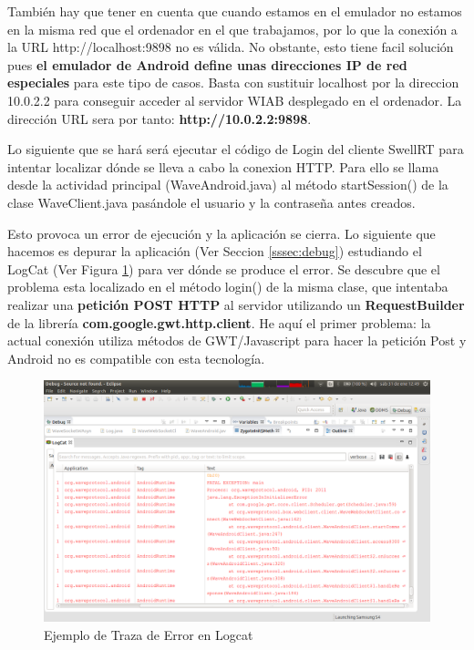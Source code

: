 	  	 También hay que tener en cuenta que cuando estamos en el emulador no estamos en la misma red que el ordenador en el que trabajamos, por lo que la conexión a la URL http://localhost:9898 no es válida. No obstante, esto tiene facil solución pues \textbf{el emulador de Android define unas direcciones IP de red especiales} \cite{ref:android_netAddress} para este tipo de casos. Basta con sustituir localhost por la direccion 10.0.2.2 para conseguir acceder al servidor WIAB desplegado en el ordenador. La dirección URL sera por tanto: \textbf{http://10.0.2.2:9898}. 
	  
	 Lo siguiente que se hará será ejecutar el código de Login del cliente SwellRT para intentar localizar dónde se lleva a cabo la conexion HTTP. Para ello se llama desde la actividad principal (WaveAndroid.java) al método startSession() de la clase WaveClient.java pasándole el usuario y la contraseña antes creados.
 
	 Esto provoca un error de ejecución y la aplicación se cierra. Lo siguiente que hacemos es depurar la aplicación (Ver Seccion \ref{sssec:debug}) estudiando el LogCat \cite{ref:android_logcat} (Ver Figura \ref{fig:android_logcat}) para ver dónde se produce el error. Se descubre que el problema esta localizado en el método login() de la misma clase, que intentaba realizar una \textbf{petición POST HTTP} al servidor utilizando un \textbf{RequestBuilder} de la librería \textbf{com.google.gwt.http.client}. He aquí el primer problema: la actual conexión utiliza métodos de GWT/Javascript para hacer la petición Post y Android no es compatible con esta tecnología.   
	 
	\begin{figure}[H]
      \centering
	\includegraphics[keepaspectratio, scale=0.3]{Media/Captures/logcat_example.png}
      \caption{Ejemplo de Traza de Error en Logcat}
      \label{fig:android_logcat}
    \end{figure} 
	 
